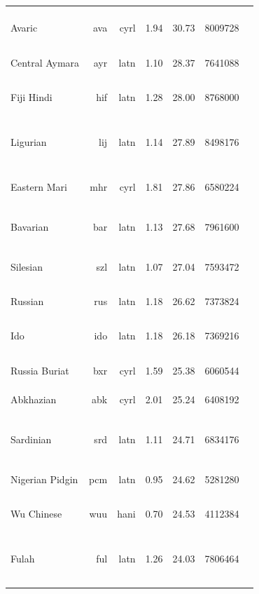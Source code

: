 \documentclass[11pt]{article}
\begin{document}
\begin{center}
\begin{longtable}[width=0.9\textwidth]{|lrrrrrl|}
Avaric & ava & cyrl & 1.94 & 30.73 & 8009728 & {\color{oscar}\rule{0.02cm}{8pt}}{\color{madlad400}\rule{2.82cm}{8pt}}{\color{other}\rule{1.1600000000000001cm}{8pt}} \\ 
Central Aymara & ayr & latn & 1.10 & 28.37 & 7641088 & {\color{nllb}\rule{4.0cm}{8pt}}{\color{glot500}\rule{0.0cm}{8pt}} \\ 
Fiji Hindi & hif & latn & 1.28 & 28.00 & 8768000 & {\color{madlad400}\rule{0.91cm}{8pt}}{\color{glot500}\rule{2.96cm}{8pt}}{\color{other}\rule{0.1299999999999999cm}{8pt}} \\ 
Ligurian & lij & latn & 1.14 & 27.89 & 8498176 & {\color{nllb}\rule{2.34cm}{8pt}}{\color{glot500}\rule{0.85cm}{8pt}}{\color{other}\rule{0.81cm}{8pt}} \\ 
Eastern Mari & mhr & cyrl & 1.81 & 27.86 & 6580224 & {\color{oscar}\rule{0.12cm}{8pt}}{\color{glot500}\rule{0.28cm}{8pt}}{\color{other}\rule{3.6cm}{8pt}} \\ 
Bavarian & bar & latn & 1.13 & 27.68 & 7961600 & {\color{glot500}\rule{2.56cm}{8pt}}{\color{other}\rule{1.44cm}{8pt}} \\ 
Silesian & szl & latn & 1.07 & 27.04 & 7593472 & {\color{nllb}\rule{1.58cm}{8pt}}{\color{glot500}\rule{1.36cm}{8pt}}{\color{other}\rule{1.0599999999999996cm}{8pt}} \\ 
Russian & rus & latn & 1.18 & 26.62 & 7373824 & {\color{madlad400}\rule{4.0cm}{8pt}} \\ 
Ido & ido & latn & 1.18 & 26.18 & 7369216 & {\color{oscar}\rule{0.01cm}{8pt}}{\color{glot500}\rule{2.38cm}{8pt}}{\color{other}\rule{1.6100000000000003cm}{8pt}} \\ 
Russia Buriat & bxr & cyrl & 1.59 & 25.38 & 6060544 & {\color{oscar}\rule{0.0cm}{8pt}}{\color{other}\rule{4.0cm}{8pt}} \\ 
Abkhazian & abk & cyrl & 2.01 & 25.24 & 6408192 & {\color{glot500}\rule{3.85cm}{8pt}}{\color{other}\rule{0.1499999999999999cm}{8pt}} \\ 
Sardinian & srd & latn & 1.11 & 24.71 & 6834176 & {\color{nllb}\rule{1.34cm}{8pt}}{\color{glot500}\rule{1.77cm}{8pt}}{\color{other}\rule{0.8899999999999997cm}{8pt}} \\ 
Nigerian Pidgin & pcm & latn & 0.95 & 24.62 & 5281280 & {\color{glot500}\rule{1.92cm}{8pt}}{\color{other}\rule{2.08cm}{8pt}} \\ 
Wu Chinese & wuu & hani & 0.70 & 24.53 & 4112384 & {\color{glot500}\rule{2.49cm}{8pt}}{\color{other}\rule{1.5099999999999998cm}{8pt}} \\ 
Fulah & ful & latn & 1.26 & 24.03 & 7806464 & {\color{nllb}\rule{2.66cm}{8pt}}{\color{madlad400}\rule{0.03cm}{8pt}}{\color{glot500}\rule{1.08cm}{8pt}}{\color{other}\rule{0.22999999999999998cm}{8pt}} \\ 

\end{longtable}
\end{center}
\end{document}
